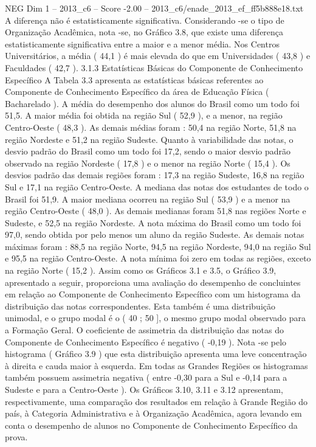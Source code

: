 \begin{textsample}{NEG Dim 1 – 2013\_c6 – Score -2.00 – 2013\_c6/enade\_2013\_ef\_ff5b888e18.txt}
A diferença não é estatisticamente significativa.
Considerando -se o tipo de Organização Acadêmica, nota -se, no Gráfico 3.8, que existe uma diferença estatisticamente significativa entre a maior e a menor média.
Nos Centros Universitários, a média ( 44,1 ) é mais elevada do que em Universidades ( 43,8 ) e Faculdades ( 42,7 ). 3.1.3 Estatísticas Básicas do Componente de Conhecimento Específico A Tabela 3.3 apresenta as estatísticas básicas referentes ao Componente de Conhecimento Específico da área de Educação Física ( Bacharelado ).
A média do desempenho dos alunos do Brasil como um todo foi 51,5.
A maior média foi obtida na região Sul ( 52,9 ), e a menor, na região Centro-Oeste ( 48,3 ).
As demais médias foram : 50,4 na região Norte, 51,8 na região Nordeste e 51,2 na região Sudeste.
Quanto à variabilidade das notas, o desvio padrão do Brasil como um todo foi 17,2, sendo o maior desvio padrão observado na região Nordeste ( 17,8 ) e o menor na região Norte ( 15,4 ).
Os desvios padrão das demais regiões foram : 17,3 na região Sudeste, 16,8 na região Sul e 17,1 na região Centro-Oeste.
A mediana das notas dos estudantes de todo o Brasil foi 51,9.
A maior mediana ocorreu na região Sul ( 53,9 ) e a menor na região Centro-Oeste ( 48,0 ).
As demais medianas foram 51,8 nas regiões Norte e Sudeste, e 52,5 na região Nordeste.
A nota máxima do Brasil como um todo foi 97,0, sendo obtida por pelo menos um aluno da região Sudeste.
As demais notas máximas foram : 88,5 na região Norte, 94,5 na região Nordeste, 94,0 na região Sul e 95,5 na região Centro-Oeste.
A nota mínima foi zero em todas as regiões, exceto na região Norte ( 15,2 ).
Assim como os Gráficos 3.1 e 3.5, o Gráfico 3.9, apresentado a seguir, proporciona uma avaliação do desempenho de concluintes em relação ao Componente de Conhecimento Específico com um histograma da distribuição das notas correspondentes.
Esta também é uma distribuição unimodal, e o grupo modal é o ( 40 ; 50 ], o mesmo grupo modal observado para a Formação Geral.
O coeficiente de assimetria da distribuição das notas do Componente de Conhecimento Específico é negativo ( -0,19 ).
Nota -se pelo histograma ( Gráfico 3.9 ) que esta distribuição apresenta uma leve concentração à direita e cauda maior à esquerda.
Em todas as Grandes Regiões os histogramas também possuem assimetria negativa ( entre -0,30 para a Sul e -0,14 para a Sudeste e para a Centro-Oeste ).
Os Gráficos 3.10, 3.11 e 3.12 apresentam, respectivamente, uma comparação dos resultados em relação à Grande Região do país, à Categoria Administrativa e à Organização Acadêmica, agora levando em conta o desempenho de alunos no Componente de Conhecimento Específico da prova.

\end{textsample}
